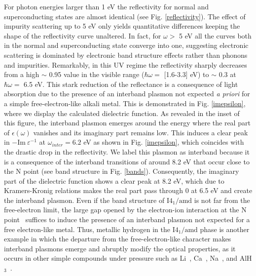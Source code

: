 \documentclass[%
 reprint,
superscriptaddress,
 amsmath,amssymb,
 aps,
prb,
floatfix,
]{revtex4-1}
\begin{document}
For photon energies larger than 1 eV the reflectivity for normal and superconducting states
are almost identical (see Fig. \ref{reflectivity}). The effect of impurity scattering up to 
5 eV only yields quantitative differences 
keeping the shape of the reflectivity curve
unaltered. In fact, for $\omega>$ 5 eV all the curves both in the normal 
and superconducting state converge into one, suggesting
electronic scattering is dominated by electronic band structure effects 
rather than phonons and impurities.
Remarkably, in this UV regime the reflectivity sharply decreases from a  
high $\sim$ 0.95 value in the visible range ($\hbar\omega=$ [1.6-3.3] eV) 
to $\sim$ 0.3 at $\hbar\omega=$ 6.5 eV. 
This stark reduction of the reflectance is a consequence of light absorption 
due to the presence of an interband plasmon
not expected \emph{a priori} for a simple free-electron-like 
alkali metal. This is demonstrated in Fig. \ref{imepsilon}, where we display the calculated dielectric function. 
As revealed in the inset of this figure, the interband plasmon emerges around the energy where the real part of $\epsilon(\omega)$ vanishes
and its imaginary part remains low. 
This induces a clear peak in $-\text{Im}~\varepsilon^{-1}$ at $\omega_{inter}=6.2$ 
eV as shown in Fig. \ref{imepsilon}, which coincides with
the drastic drop in the reflectivity.
We label this plasmon as interband because it is a consequence
of the interband transitions of around 8.2 eV
that occur close to the N point (see band structure in Fig. \ref{bands}).
Consequently, the imaginary part of the dielectric function shows
a clear peak at 8.2 eV, which due to Kramers-Kronig relations
makes the real part pass through 0 at 6.5 eV and create the
interband plasmon.
Even if the band structure of $\mathrm{I4_1/amd}$
is not far from the free-electron limit, the large gap
opened by the electron-ion interaction at the N point~\cite{PhysRevB.93.174308}
suffices to induce the presence of an interband plasmon not expected
for a free electron-like metal. Thus, metallic hydrogen
in the $\mathrm{I4_1/amd}$ phase is another example in which
the departure from the free-electron-like character
makes interband plasmons emerge and abruptly modify  
the optical properties, as it occurs in other simple 
compounds under pressure such as Li~\cite{silkin:172102,1367-2630-10-5-053035,PhysRevB.81.205105}, 
Ca~\cite{PhysRevB.86.085106}, Na~\cite{PhysRevB.89.085102,Mao20122011}, 
and AlH$_3$~\cite{PhysRevB.82.085113}. 
\end{document}
